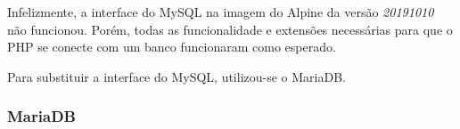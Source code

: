 Infelizmente, a interface do MySQL na imagem do Alpine da versão \textit{20191010} não funcionou. Porém, todas as funcionalidade e extensões necessárias para que o PHP se conecte com um banco funcionaram como esperado.

Para substituir a interface do MySQL, utilizou-se o MariaDB.

\subsubsection{MariaDB}\label{mariadb}

 \blindtext

 \blindtext

 \blindtext













